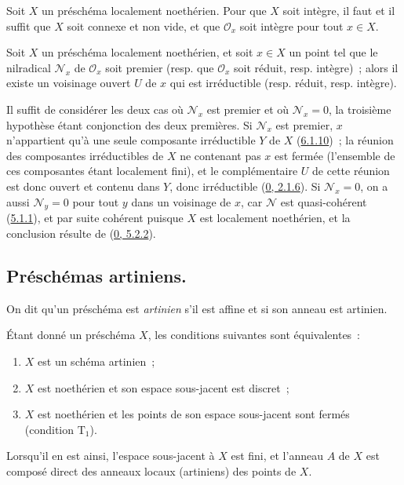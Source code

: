 \begin{corollary}[6.1.12]
\label{I.6.1.12-fr}
Soit $X$ un préschéma localement noethérien. Pour que $X$ soit intègre, il
faut et il suffit que $X$ soit connexe et non vide, et que $\mathscr{O}_x$ soit intègre
pour tout $x\in X$.
\end{corollary}

\begin{proposition}[6.1.13]
\label{I.6.1.13-fr}
Soit $X$ un préschéma localement noethérien, et soit $x\in X$ un point tel que
le nilradical $\mathscr{N}_x$ de $\mathscr{O}_x$ soit premier (resp. que
$\mathscr{O}_x$ soit réduit, resp. intègre)~; alors il existe un voisinage
ouvert $U$ de $x$ qui est irréductible (resp. réduit, resp. intègre).
\end{proposition}

Il suffit de considérer les deux cas où $\mathscr{N}_x$ est premier et où
$\mathscr{N}_x=0$, la troisième hypothèse étant conjonction des deux
premières. Si $\mathscr{N}_x$ est premier, $x$ n'appartient qu'à une seule
composante irréductible $Y$ de $X$ (\hyperref[I.6.1.10-fr]{6.1.10})~; la
réunion des composantes irréductibles de $X$ ne contenant pas $x$ est fermée
(l'ensemble de ces composantes étant localement fini), et le complémentaire
$U$ de cette réunion est donc ouvert et contenu dans $Y$, donc irréductible
(\hyperref[0.2.1.6-fr]{0, 2.1.6}). Si $\mathscr{N}_x=0$, on a aussi
$\mathscr{N}_y=0$ pour tout $y$ dans un voisinage de $x$, car $\mathscr{N}$
est quasi-cohérent (\hyperref[I.5.1.1-fr]{5.1.1}), et par suite cohérent
puisque $X$ est localement noethérien, et la conclusion résulte de
(\hyperref[0.5.2.2-fr]{0, 5.2.2}).

\subsection{Préschémas artiniens.}
\label{subsection:I.6.2-fr}

\begin{definition}[6.2.1]
\label{I.6.2.1-fr}
On dit qu'un préschéma est \emph{artinien} s'il est affine et si son anneau
est artinien.
\end{definition}

\begin{proposition}[6.2.2]
\label{I.6.2.2-fr}
Étant donné un préschéma $X$, les conditions suivantes sont équivalentes~:
\begin{enumerate}
  \item[a)] $X$ est un schéma artinien~;
  \item[b)] $X$ est noethérien et son espace sous-jacent est discret~;
  \item[c)] $X$ est noethérien et les points de son espace sous-jacent sont
    fermés (condition $\mathrm{T}_1$).
\end{enumerate}

Lorsqu'il en est ainsi, l'espace sous-jacent à $X$ est fini, et l'anneau $A$
de $X$ est composé direct des anneaux locaux (artiniens) des points de $X$.
\end{proposition}

